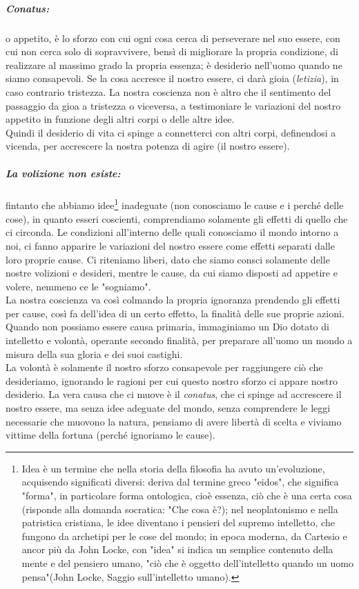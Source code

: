 \subparagraph{Conatus:} o appetito, è lo sforzo con cui ogni cosa cerca di perseverare nel suo essere, con cui non cerca solo di sopravvivere, bensì di migliorare la propria condizione, di realizzare al massimo grado la propria essenza; è desiderio nell'uomo quando ne siamo consapevoli. Se la cosa accresce il nostro essere, ci darà gioia (\textit{letizia}), in caso contrario tristezza. La nostra coscienza non è altro che il sentimento del passaggio da gioa a tristezza o viceversa, a testimoniare le variazioni del nostro appetito in funzione degli altri corpi o delle altre idee.\\
Quindi il desiderio di vita ci spinge a connetterci con altri corpi, definendosi a vicenda, per accrescere la nostra potenza di agire (il nostro essere).
\subparagraph{La volizione non esiste:}fintanto che abbiamo idee\footnote{Idea è un termine che nella storia della filosofia ha avuto un'evoluzione, acquisendo significati diversi: deriva dal termine greco "eidos", che significa "forma", in particolare forma ontologica, cioè essenza, ciò che è una certa cosa (risponde alla domanda socratica: "Che cosa è?); nel neoplatonismo e nella patristica cristiana, le idee diventano i pensieri del supremo intelletto, che fungono da archetipi per le cose del mondo; in epoca moderna, da Cartesio e ancor più da John Locke, con "idea" si indica un semplice contenuto della mente e del pensiero umano, "ciò che è oggetto dell'intelletto quando un uomo pensa"(John Locke, Saggio sull'intelletto umano).} inadeguate (non conosciamo le cause e i perché delle cose), in quanto esseri coscienti, comprendiamo solamente gli effetti di quello che ci circonda. Le condizioni all'interno delle quali conosciamo il mondo intorno a noi, ci fanno apparire le variazioni del nostro essere come effetti separati dalle loro proprie cause. Ci riteniamo liberi, dato che siamo consci solamente delle nostre volizioni e desideri, mentre le cause, da cui siamo disposti ad appetire e volere, nemmeno ce le "sogniamo".\\
La nostra coscienza va così colmando la propria ignoranza prendendo gli effetti per cause, così fa dell'idea di un certo effetto, la finalità delle sue proprie azioni. Quando non possiamo essere causa primaria, immaginiamo un Dio dotato di intelletto e volontà, operante secondo finalità, per preparare all'uomo un mondo a misura della sua gloria e dei suoi castighi.\\
La volontà è solamente il nostro sforzo consapevole per raggiungere ciò che desideriamo, ignorando le ragioni per cui questo nostro sforzo ci appare nostro desiderio. La vera causa che ci muove è il \textit{conatus}, che ci spinge ad accrescere il nostro essere, ma senza idee adeguate del mondo, senza comprendere le leggi necessarie che muovono la natura, pensiamo di avere libertà di scelta e viviamo vittime della fortuna (perché ignoriamo le cause).
